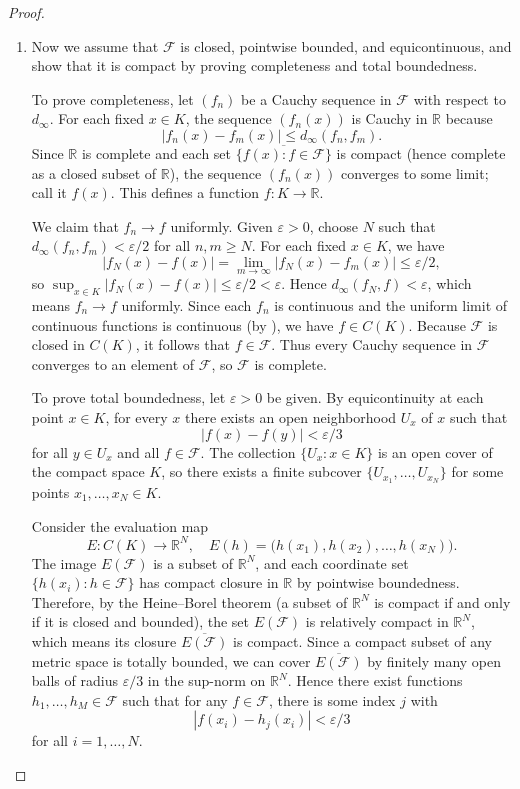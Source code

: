 \begin{proof}
\begin{enumerate}
    \item Now we assume that $\mathcal{F}$ is closed, pointwise bounded, and equicontinuous, and show that it is compact by proving completeness and total boundedness.

    To prove completeness, let $(f_n)$ be a Cauchy sequence in $\mathcal{F}$ with respect to $d_\infty$. For each fixed $x \in K$, the sequence $(f_n(x))$ is Cauchy in $\mathbb{R}$ because $$|f_n(x) - f_m(x)| \leq d_\infty(f_n,f_m).$$ Since $\mathbb{R}$ is complete and each set $\overline{\{f(x) : f \in \mathcal{F}\}}$ is compact (hence complete as a closed subset of $\mathbb{R}$), the sequence $(f_n(x))$ converges to some limit; call it $f(x)$. This defines a function $f: K \to \mathbb{R}$.

    We claim that $f_n \to f$ uniformly. Given $\varepsilon > 0$, choose $N$ such that $d_\infty(f_n, f_m) < \varepsilon/2$ for all $n,m \geq N$. For each fixed $x \in K$, we have $$|f_N(x) - f(x)| = \lim_{m \to \infty} |f_N(x) - f_m(x)| \leq \varepsilon/2,$$ so $\sup_{x \in K} |f_N(x) - f(x)| \leq \varepsilon/2 < \varepsilon$. Hence $d_\infty(f_N, f) < \varepsilon$, which means $f_n \to f$ uniformly. Since each $f_n$ is continuous and the uniform limit of continuous functions is continuous (by ), we have $f \in C(K)$. Because $\mathcal{F}$ is closed in $C(K)$, it follows that $f \in \mathcal{F}$. Thus every Cauchy sequence in $\mathcal{F}$ converges to an element of $\mathcal{F}$, so $\mathcal{F}$ is complete.

    To prove total boundedness, let $\varepsilon > 0$ be given. By equicontinuity at each point $x \in K$, for every $x$ there exists an open neighborhood $U_x$ of $x$ such that $$|f(x) - f(y)| < \varepsilon/3$$ for all $y \in U_x$ and all $f \in \mathcal{F}$. The collection $\{U_x : x \in K\}$ is an open cover of the compact space $K$, so there exists a finite subcover $\{U_{x_1}, \dots, U_{x_N}\}$ for some points $x_1, \dots, x_N \in K$.

    Consider the evaluation map $$E : C(K) \to \mathbb{R}^N, \quad E(h) = \bigl(h(x_1), h(x_2), \dots, h(x_N)\bigr).$$ The image $E(\mathcal{F})$ is a subset of $\mathbb{R}^N$, and each coordinate set $\{h(x_i) : h \in \mathcal{F}\}$ has compact closure in $\mathbb{R}$ by pointwise boundedness. Therefore, by the Heine–Borel theorem (a subset of $\mathbb{R}^N$ is compact if and only if it is closed and bounded), the set $E(\mathcal{F})$ is relatively compact in $\mathbb{R}^N$, which means its closure $\overline{E(\mathcal{F})}$ is compact. Since a compact subset of any metric space is totally bounded, we can cover $\overline{E(\mathcal{F})}$ by finitely many open balls of radius $\varepsilon/3$ in the sup-norm on $\mathbb{R}^N$. Hence there exist functions $h_1, \dots, h_M \in \mathcal{F}$ such that for any $f \in \mathcal{F}$, there is some index $j$ with $$|f(x_i) - h_j(x_i)| < \varepsilon/3$$ for all $i = 1, \dots, N$.


\end{enumerate}
\end{proof}
